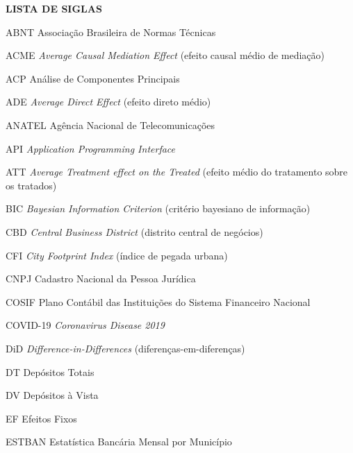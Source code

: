 \newpage
\renewcommand{\listfigurename}{LISTA DE FIGURAS}
\pagestyle{fancy}
\listoffigures

\newpage
\renewcommand{\listtablename}{LISTA DE TABELAS}
\pagestyle{fancy}
\listoftables

\newpage
\begin{spacing}{1.5}
\begin{center}
\textbf{LISTA DE SIGLAS}
\end{center}
\vspace{1em}

\begin{list}{}{%
  \setlength{\labelwidth}{2.5cm}%
  \setlength{\labelsep}{0.5cm}%
  \setlength{\leftmargin}{3cm}%
  \setlength{\itemsep}{0pt}%
  \setlength{\parsep}{0pt}%
  \renewcommand{\makelabel}[1]{#1\hfill}%
}
\item[ABNT] Associação Brasileira de Normas Técnicas
\item[ACME] \textit{Average Causal Mediation Effect} (efeito causal médio de mediação)
\item[ACP] Análise de Componentes Principais
\item[ADE] \textit{Average Direct Effect} (efeito direto médio)
\item[ANATEL] Agência Nacional de Telecomunicações
\item[API] \textit{Application Programming Interface}
\item[ATT] \textit{Average Treatment effect on the Treated} (efeito médio do tratamento sobre os tratados)
\item[BIC] \textit{Bayesian Information Criterion} (critério bayesiano de informação)
\item[CBD] \textit{Central Business District} (distrito central de negócios)
\item[CFI] \textit{City Footprint Index} (índice de pegada urbana)
\item[CNPJ] Cadastro Nacional da Pessoa Jurídica
\item[COSIF] Plano Contábil das Instituições do Sistema Financeiro Nacional
\item[COVID-19] \textit{Coronavirus Disease 2019}
\item[DiD] \textit{Difference-in-Differences} (diferenças-em-diferenças)
\item[DT] Depósitos Totais
\item[DV] Depósitos à Vista
\item[EF] Efeitos Fixos
\item[ESTBAN] Estatística Bancária Mensal por Município

\end{list}
\end{spacing}
